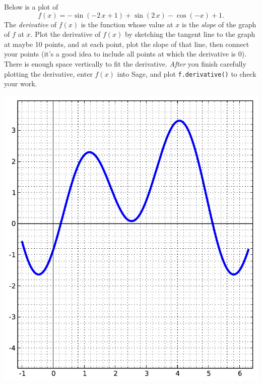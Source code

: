 Below is a plot of $$f(x)=-\sin\left(-2 \, x + 1\right) + \sin\left(2 \, x\right) - \cos\left(-x\right) + 1.$$  The {\em \color{red}derivative} of $f(x)$ is the function whose value at $x$ is the {\em slope} of the graph of $f$ at $x$.  Plot the derivative of $f(x)$ by sketching the tangent line to the graph at maybe 10 points, and at each point, plot the slope of that line, then connect your points (it's a good idea to include all points at which the derivative is 0).  There is enough space vertically to fit the derivative.  {\em After} you finish carefully plotting the derivative, enter $f(x)$ into Sage, and plot {\color{blue}\verb|f.derivative()|} to check your work.
\begin{center}\includegraphics{functions/79.pdf}\end{center}\newpage

